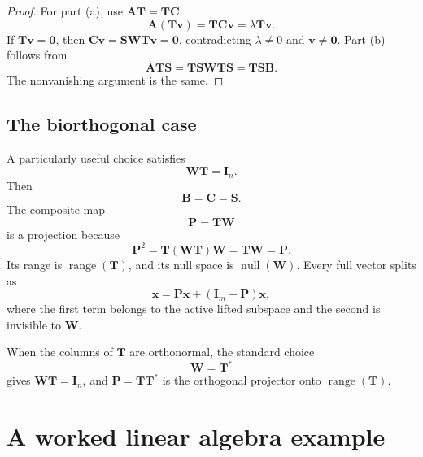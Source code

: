 \documentclass[11pt]{article}
\newcommand{\I}{\mathbf{I}}
\newcommand{\mat}[1]{\mathbf{#1}}
\newcommand{\vect}[1]{\mathbf{#1}}
\newcommand{\range}{\operatorname{range}}
\newcommand{\nullsp}{\operatorname{null}}
\theoremstyle{definition}
\theoremstyle{remark}
\begin{document}
\begin{proof}
For part (a), use \(\mat{A}\mat{T}=\mat{T}\mat{C}\):
\[
  \mat{A}(\mat{T}\vect{v})
  =\mat{T}\mat{C}\vect{v}
  =\lambda\mat{T}\vect{v}.
\]
If \(\mat{T}\vect{v}=\vect{0}\), then
\(\mat{C}\vect{v}=\mat{S}\mat{W}\mat{T}\vect{v}=\vect{0}\), contradicting \(\lambda\neq0\) and \(\vect{v}\neq\vect{0}\). Part (b) follows from
\[
  \mat{A}\mat{T}\mat{S}
  =\mat{T}\mat{S}\mat{W}\mat{T}\mat{S}
  =\mat{T}\mat{S}\mat{B}.
\]
The nonvanishing argument is the same.
\end{proof}

\subsection{The biorthogonal case}

A particularly useful choice satisfies
\begin{equation}
  \mat{W}\mat{T}=\I_n.
  \label{eq:biorthogonal}
\end{equation}
Then
\begin{equation}
  \mat{B}=\mat{C}=\mat{S}.
  \label{eq:B-C-equal-S}
\end{equation}
The composite map
\begin{equation}
  \mat{P}=\mat{T}\mat{W}
  \label{eq:P-definition}
\end{equation}
is a projection because
\[
  \mat{P}^2
  =\mat{T}(\mat{W}\mat{T})\mat{W}
  =\mat{T}\mat{W}
  =\mat{P}.
\]
Its range is \(\range(\mat{T})\), and its null space is \(\nullsp(\mat{W})\). Every full vector splits as
\begin{equation}
  \vect{x}
  =\mat{P}\vect{x}+(\I_m-\mat{P})\vect{x},
  \label{eq:projection-decomposition}
\end{equation}
where the first term belongs to the active lifted subspace and the second is invisible to \(\mat{W}\).

When the columns of \(\mat{T}\) are orthonormal, the standard choice
\begin{equation}
  \mat{W}=\mat{T}^{*}
  \label{eq:orthogonal-W}
\end{equation}
gives \(\mat{W}\mat{T}=\I_n\), and \(\mat{P}=\mat{T}\mat{T}^{*}\) is the orthogonal projector onto \(\range(\mat{T})\).

\section{A worked linear algebra example}
\label{sec:worked-linear-algebra}
\end{document}
